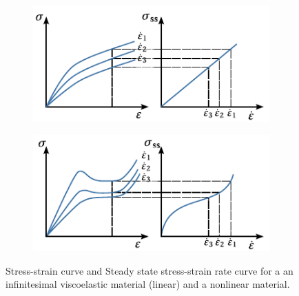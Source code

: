 \begin{figure}
\centering
  \begin{subfigure}[b]{0.45\textwidth}
            \centering
            \includegraphics[width=\textwidth]{figures/constant_strain_rate_expected}
            \caption{}
            \label{subfig:constant_strain_rate_expected}
    \end{subfigure} \hfill
    \begin{subfigure}[b]{0.45\textwidth}
            \centering
            \includegraphics[width=\textwidth]{figures/constant_strain_rate_nonlinear}
            \caption{}
            \label{subfig:constant_strain_rate_nonlinear}
    \end{subfigure}
  \caption{Stress-strain curve and Steady state stress-strain rate curve for a  an infinitesimal viscoelastic material (linear) and a  nonlinear material.}
\label{fig:constant_strain_rate_results}
\end{figure}

